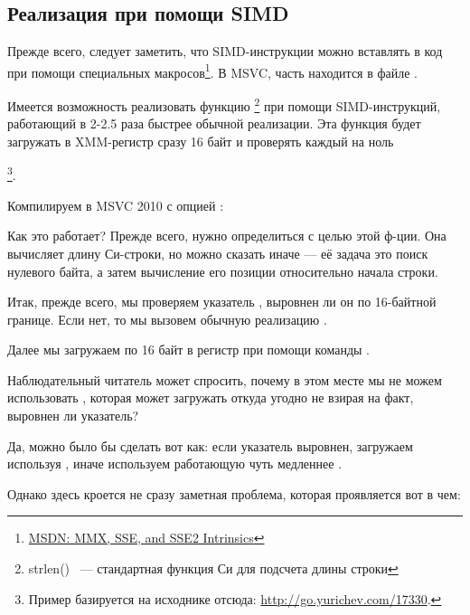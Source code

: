 ﻿\subsection{Реализация \strlen при помощи SIMD}
\label{SIMD_strlen}

\newcommand{\URLMSDNSSE}{\href{http://go.yurichev.com/17262}{MSDN: MMX, SSE, and SSE2 Intrinsics}}

Прежде всего, следует заметить, что SIMD-инструкции можно вставлять в \CCpp код при помощи специальных 
макросов\footnote{\URLMSDNSSE}. В MSVC, часть находится в файле .

\newcommand{\URLSTRLEN}{http://go.yurichev.com/17330}

Имеется возможность реализовать функцию \strlen\footnote{strlen() ~--- стандартная функция Си 
для подсчета длины строки} при помощи SIMD-инструкций, работающий в 2-2.5 раза быстрее обычной реализации. 
Эта функция будет загружать в XMM-регистр сразу 16 байт и проверять каждый на ноль

\footnote{Пример базируется на исходнике отсюда: \url{\URLSTRLEN}.}.



Компилируем в MSVC 2010 с опцией \Ox:



Как это работает?
Прежде всего, нужно определиться с целью этой ф-ции.
Она вычисляет длину Си-строки, но можно сказать иначе --- её задача это поиск нулевого байта, а затем вычисление его позиции относительно начала строки.

Итак, прежде всего, мы проверяем указатель , выровнен ли он по 16-байтной границе. 
Если нет, то мы вызовем обычную реализацию \strlen.

Далее мы загружаем по 16 байт в регистр  при помощи команды \MOVDQA.

Наблюдательный читатель может спросить, почему в этом месте мы не можем использовать \MOVDQU, 
которая может загружать откуда угодно не взирая на факт, выровнен ли указатель?

Да, можно было бы сделать вот как: если указатель выровнен, загружаем используя \MOVDQA, 
иначе используем работающую чуть медленнее \MOVDQU.

Однако здесь кроется не сразу заметная проблема, которая проявляется вот в чем:

